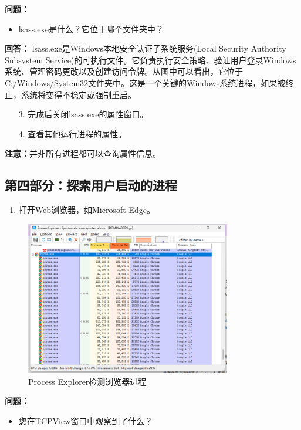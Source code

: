 \documentclass[12pt,a4paper]{article}
\begin{document}
\textbf{问题：}
\begin{itemize}
    \item lsass.exe是什么？它位于哪个文件夹中？
\end{itemize}

\textbf{回答：}
lsass.exe是Windows本地安全认证子系统服务(Local Security Authority Subsystem Service)的可执行文件。它负责执行安全策略、验证用户登录Windows系统、管理密码更改以及创建访问令牌。从图中可以看出，它位于C:/Windows/System32文件夹中。这是一个关键的Windows系统进程，如果被终止，系统将变得不稳定或强制重启。

\begin{enumerate}
    \item[3.] 完成后关闭lsass.exe的属性窗口。
    \item[4.] 查看其他运行进程的属性。
\end{enumerate}

\textbf{注意：}并非所有进程都可以查询属性信息。

\subsection{第四部分：探索用户启动的进程}

\begin{enumerate}
    \item 打开Web浏览器，如Microsoft Edge。
\end{enumerate}

\begin{figure}[H]
    \centering
    \includegraphics[width=0.8\textwidth]{proecxp.png}
    \caption{Process Explorer检测浏览器进程}
    \label{fig:procexp}
\end{figure}

\textbf{问题：}
\begin{itemize}
    \item 您在TCPView窗口中观察到了什么？
\end{itemize}
\end{document}
